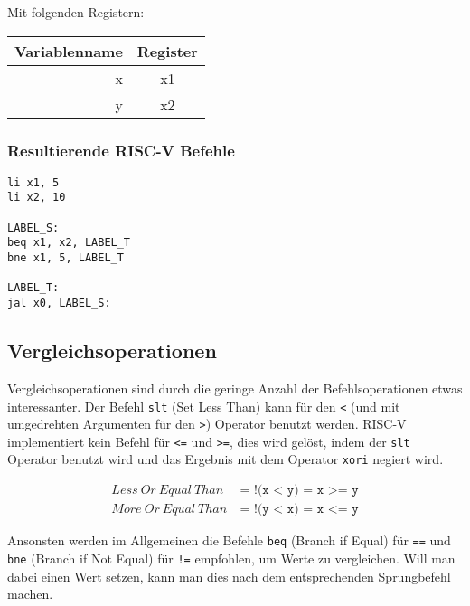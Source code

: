 Mit folgenden Registern:

\begin{table}[H]
  \begin{center}
    \begin{tabular}{| r | c |}
      \hline
      Variablenname & Register \\
      \hline
      x & x1 \\
      y & x2 \\
      \hline
    \end{tabular}
  \end{center}
\end{table}

\subsubsection{Resultierende RISC-V Befehle}

\begin{lstlisting}
li x1, 5
li x2, 10

LABEL_S:
beq x1, x2, LABEL_T
bne x1, 5, LABEL_T

LABEL_T:
jal x0, LABEL_S:
\end{lstlisting}

\subsection{Vergleichsoperationen}

Vergleichsoperationen sind durch die geringe Anzahl der Befehlsoperationen etwas interessanter.
Der Befehl \texttt{slt} (Set Less Than) kann für den \texttt{<} (und mit umgedrehten Argumenten für den \texttt{>}) Operator benutzt werden.
RISC-V implementiert kein Befehl für \texttt{<=} und \texttt{>=}, dies wird gelöst, indem der \texttt{slt} Operator benutzt wird und das Ergebnis mit dem Operator \texttt{xori} negiert wird.

\begin{figure}[H]
  \begin{align*}
    Less\ Or\ Equal\ Than\ &\texttt{=\ !(x < y) = x >= y}\\
    More\ Or\ Equal\ Than\ &\texttt{=\ !(y < x) = x <= y}
  \end{align*}
\end{figure}
Ansonsten werden im Allgemeinen die Befehle \texttt{beq} (Branch if Equal) für \texttt{==} und \texttt{bne} (Branch if Not Equal) für \texttt{!=} empfohlen, um Werte zu vergleichen.
Will man dabei einen Wert setzen, kann man dies nach dem entsprechenden Sprungbefehl machen.\\

